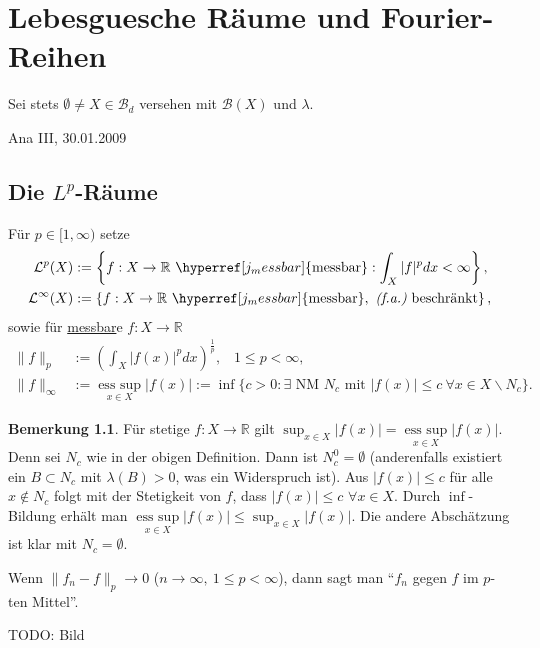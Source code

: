 \documentclass[a4paper]{scrreprt}
\newcommand{\R}{\mathbb{R}}
\newcommand{\Borel}{\mathcal{B}}
\newcommand{\Bd}{\Borel_d}
\newcommand{\Leb}{\mathcal{L}}
\newcommand{\jlabel}[1]{\label{j_#1}}
\newcommand{\jshortlink}[1]{\jhyperref{#1}{\text{#1}}}
\newcommand{\jhyperref}[2]{\hyperref[j_#1]{#2}}
\newcommand{\jlink}[1]{\jhyperref{#1}{#1}}
\newcommand{\fa}{\text{\textit{(f.a.)}}}
\newcommand{\jabb}[3]{ #1: #2 \rightarrow #3 }
\newcommand{\jspace}{\vspace{8pt}}
\newcommand{\jspacesmall}{\vspace{4pt}}
\newcommand{\jdate}[1]{\jspacesmall\begin{center}\jlabel{#1}\tiny{Ana III, #1}\end{center}}
\newcommand{\esssup}{\mathop{\mathrm{ess\ sup}}\limits}
\theoremstyle{plain}
\theoremstyle{definition}
\newtheorem*{bem*}{Bemerkung}
\begin{document}
{{{{\chapter{Lebesguesche Räume und Fourier-Reihen}
    
    Sei stets $\emptyset \ne X \in \Bd$ versehen mit $\Borel(X)$ und $\lambda$.
    
\jdate{30.01.2009}

\section{Die $L^p$-Räume}

Für $p \in [1,\infty)$ setze
\[
    \begin{split}
        \Leb^p(X) &:= \left\{\jabb{f}{X}{\R}\ \jshortlink{messbar} : \int_X |f|^p dx < \infty \right\},\\
        \Leb^\infty(X) &:= \left\{\jabb{f}{X}{\R}\ \jshortlink{messbar}, \ \fa \text{ beschränkt} \right\},
    \end{split}
\]
sowie für \jlink{messbar}e $\jabb{f}{X}{\R}$
\[
    \begin{split}
        \lVert f \rVert_p &:= \left(\int_X |f(x)|^p dx \right)^\frac{1}{p}, \hspace{10pt} 1\le p < \infty,\\
        \lVert f \rVert_\infty &:= \esssup_{x\in X} |f(x)| := \inf \{c>0 : \exists \text{ NM } N_c \text{ mit } |f(x)| \le c \ \forall x\in X\backslash N_c\}.
    \end{split}
\]

\begin{bem*}
    Für stetige $\jabb{f}{X}{\R}$ gilt $\sup_{x\in X} |f(x)| = \esssup_{x\in X} |f(x)|$. Denn sei $N_c$ wie in der obigen Definition. Dann ist $N_c^0=\emptyset$ (anderenfalls existiert ein $B\subset N_c$ mit $\lambda(B) > 0$, was ein Widerspruch ist). Aus $|f(x)| \le c$ für alle $x\notin N_c$ folgt mit der Stetigkeit von $f$, dass $|f(x)|\le c$ $\forall x\in X$. Durch $\inf$-Bildung erhält man $\esssup_{x\in X} |f(x)| \le \sup_{x\in X} |f(x)|$. Die andere Abschätzung ist klar mit $N_c = \emptyset$.
\end{bem*}

Wenn $\lVert f_n - f \rVert_p \to 0$ ($n\to \infty,\ 1\le p < \infty$), dann sagt man ``$f_n$ gegen $f$ im $p$-ten Mittel''.

\jspace

TODO: Bild

\jspace

}}}}
\end{document}
